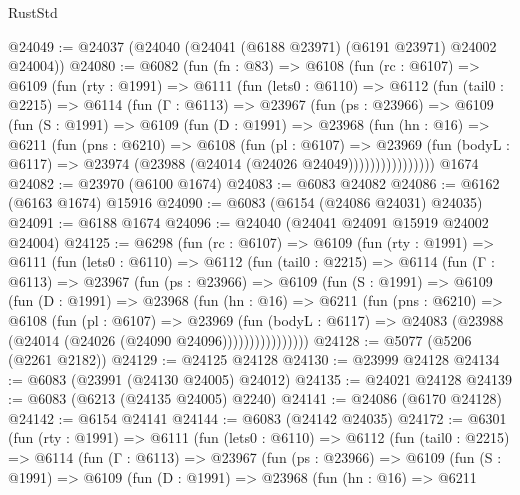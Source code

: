 \begin{lexlean}{RustStd}
\begin{coremodule}
@24049 := @24037 (@24040 (@24041 (@6188 @23971) (@6191 @23971) @24002 @24004))
@24080 := @6082
    (fun (fn : @83) =>
    @6108
      (fun (rc : @6107) =>
      @6109
        (fun (rty : @1991) =>
        @6111
          (fun (lets0 : @6110) =>
          @6112
            (fun (tail0 : @2215) =>
            @6114
              (fun (Γ : @6113) =>
              @23967
                (fun (ps : @23966) =>
                @6109
                  (fun (S : @1991) =>
                  @6109
                    (fun (D : @1991) =>
                    @23968
                      (fun (hn : @16) =>
                      @6211
                        (fun (pns : @6210) =>
                        @6108
                          (fun (pl : @6107) =>
                          @23969
                            (fun (bodyL : @6117) =>
                            @23974 (@23988 (@24014 (@24026 @24049))))))))))))))))
    @1674
@24082 := @23970 (@6100 @1674)
@24083 := @6083 @24082
@24086 := @6162 (@6163 @1674) @15916
@24090 := @6083 (@6154 (@24086 @24031) @24035)
@24091 := @6188 @1674
@24096 := @24040 (@24041 @24091 @15919 @24002 @24004)
@24125 := @6298
    (fun (rc : @6107) =>
    @6109
      (fun (rty : @1991) =>
      @6111
        (fun (lets0 : @6110) =>
        @6112
          (fun (tail0 : @2215) =>
          @6114
            (fun (Γ : @6113) =>
            @23967
              (fun (ps : @23966) =>
              @6109
                (fun (S : @1991) =>
                @6109
                  (fun (D : @1991) =>
                  @23968
                    (fun (hn : @16) =>
                    @6211
                      (fun (pns : @6210) =>
                      @6108
                        (fun (pl : @6107) =>
                        @23969
                          (fun (bodyL : @6117) =>
                          @24083 (@23988 (@24014 (@24026 (@24090 @24096))))))))))))))))
@24128 := @5077 (@5206 (@2261 @2182))
@24129 := @24125 @24128
@24130 := @23999 @24128
@24134 := @6083 (@23991 (@24130 @24005) @24012)
@24135 := @24021 @24128
@24139 := @6083 (@6213 (@24135 @24005) @2240)
@24141 := @24086 (@6170 @24128)
@24142 := @6154 @24141
@24144 := @6083 (@24142 @24035)
@24172 := @6301
    (fun (rty : @1991) =>
    @6111
      (fun (lets0 : @6110) =>
      @6112
        (fun (tail0 : @2215) =>
        @6114
          (fun (Γ : @6113) =>
          @23967
            (fun (ps : @23966) =>
            @6109
              (fun (S : @1991) =>
              @6109
                (fun (D : @1991) =>
                @23968
                  (fun (hn : @16) =>
                  @6211

\end{coremodule}
\end{lexlean}
